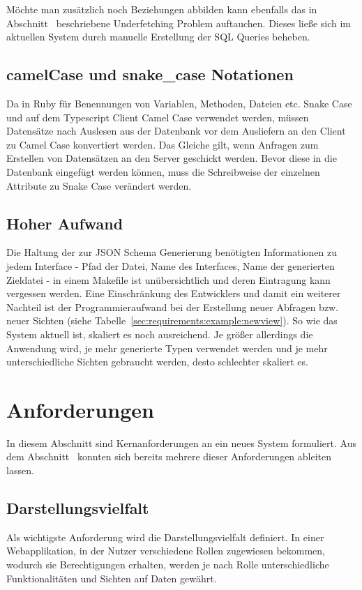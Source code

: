 Möchte man zusätzlich noch Beziehungen abbilden kann ebenfalls das in Abschnitt~ beschriebene Underfetching Problem auftauchen.
Dieses ließe sich im aktuellen System durch manuelle Erstellung der SQL Queries beheben.

\subsection{camelCase und snake\_case Notationen}
Da in Ruby für Benennungen von Variablen, Methoden, Dateien etc. Snake Case und auf dem Typescript Client Camel Case verwendet werden, müssen Datensätze nach Auslesen aus der Datenbank vor dem Ausliefern an den Client zu Camel Case konvertiert werden. Das Gleiche gilt, wenn Anfragen zum Erstellen von Datensätzen an den Server geschickt werden. Bevor diese in die Datenbank eingefügt werden können, muss die Schreibweise der einzelnen Attribute zu Snake Case verändert werden.

\subsection{Hoher Aufwand}
Die Haltung der zur JSON Schema Generierung benötigten Informationen zu jedem Interface - Pfad der Datei, Name des Interfaces, Name der generierten Zieldatei -
in einem Makefile ist unübersichtlich und deren Eintragung kann vergessen werden. 
Eine Einschränkung des Entwicklers und damit ein weiterer Nachteil ist der Programmieraufwand bei der Erstellung neuer Abfragen bzw. neuer Sichten (siehe Tabelle~\ref{sec:requirements:example:newview}).
So wie das System aktuell ist, skaliert es noch ausreichend. Je größer allerdings die Anwendung wird, je mehr generierte Typen verwendet werden und je mehr unterschiedliche Sichten gebraucht werden, desto schlechter skaliert es.

\section{Anforderungen}
\label{sec:requirements:req}
In diesem Abschnitt sind Kernanforderungen an ein neues System formuliert.
Aus dem Abschnitt~ konnten sich bereits mehrere dieser Anforderungen ableiten lassen.

\subsection{Darstellungsvielfalt}
\label{sec:requirements:req:view}
Als wichtigste Anforderung wird die Darstellungsvielfalt definiert.
In einer Webapplikation, in der Nutzer verschiedene Rollen zugewiesen bekommen, wodurch sie Berechtigungen erhalten,
werden je nach Rolle unterschiedliche Funktionalitäten und Sichten auf Daten gewährt.

